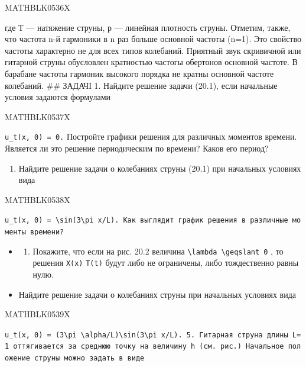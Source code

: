 \documentclass[
  ukrainian,
]{article}
\providecommand{\tightlist}{%
  \setlength{\itemsep}{0pt}\setlength{\parskip}{0pt}}
\begin{document}
MATHBLK0536X

где Т --- натяжение струны, р --- линейная плотность струны. Отметим,
также, что частота n-й гармоники в n раз больше основной частоты (n=1).
Это свойство частоты характерно не для всех типов колебаний. Приятный
звук скривичной или гитарной струны обусловлен кратностью частогы
обертонов основной частоте. В барабане частоты гармоник высокого порядка
не кратны основной частоте колебаний. \#\# ЗАДАЧІ 1. Найдите решение
задачи (20.1), если начальные условия задаются формулами

MATHBLK0537X

\texttt{u\_t(x,\ 0)\ =\ 0.} Постройте графики решения для различных
моментов времени. Является ли это решение периодическим по времени?
Каков его период?

\begin{enumerate}
\def\labelenumi{\arabic{enumi}.}
\setcounter{enumi}{1}
\tightlist
\item
  Найдите решение задачи о колебаниях струны (20.1) при начальных
  условиях вида
\end{enumerate}

MATHBLK0538X

\texttt{\textquotesingle{}u\_t(x,\ 0)\ =\ \textbackslash{}sin(3\textbackslash{}pi\ x/L).\textquotesingle{}\ Как\ выглядит\ график\ решения\ в\ различные\ моменты\ времени?}

\begin{itemize}
\tightlist
\item
  \begin{enumerate}
  \def\labelenumi{\arabic{enumi}.}
  \setcounter{enumi}{2}
  \tightlist
  \item
    Покажите, что если на рис. 20.2 величина
    \texttt{\textbackslash{}lambda\ \textbackslash{}geqslant\ 0} , то
    решения \texttt{X(x)} \texttt{T(t)} будут либо не ограничены, либо
    тождественно равны нулю.
  \end{enumerate}
\item
  Найдите решение задачи о колебаниях струны при начальных условиях вида
\end{itemize}

MATHBLK0539X

\texttt{\textquotesingle{}u\_t(x,\ 0)\ =\ (3\textbackslash{}pi\ \textbackslash{}alpha/L)\textbackslash{}sin(3\textbackslash{}pi\ x/L).\textquotesingle{}\ 5.\ Гитарная\ струна\ длины\ L=1\ оттягивается\ за\ среднюю\ точку\ на\ величину\ h\ (см.\ рис.)\ Начальное\ положение\ струны\ можно\ задать\ в\ виде}
\end{document}
